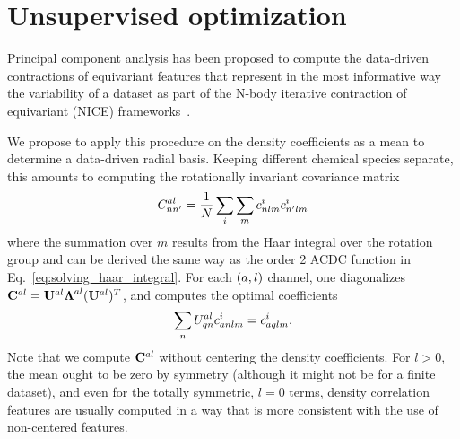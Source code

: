 \section{Unsupervised optimization}
Principal component analysis has been proposed to compute the data-driven contractions of equivariant features that represent in the most informative way the variability of a dataset as part of the N-body iterative contraction of equivariant (NICE) frameworks~\cite{niga+20jcp}.

We propose to apply this procedure on the density coefficients as a mean to determine a data-driven radial basis. 
Keeping different chemical species separate, this amounts to computing the rotationally invariant covariance matrix
\begin{equation}
  C^{a l}_{nn'}= \frac{1}{N} \sum_i \sum_m c^i_{nlm}c^i_{n^\prime lm}
\label{eq:cov}
\end{equation}
where the summation over $m$ results from the Haar integral over the rotation group and can be derived the same way as the order 2 ACDC function in Eq.~\ref{eq:solving_haar_integral}.
For each $(a, l)$ channel, one diagonalizes $\mathbf{C}^{al}=\mathbf{U}^{al} \boldsymbol{\Lambda}^{al} (\mathbf{U}^{al})^T$, and computes the optimal coefficients
\begin{equation}
  \sum_n U^{a l}_{qn} c^i_{a nlm} = c^i_{a qlm} \label{eq:contract}.
\end{equation}
Note that we compute $\mathbf{C}^{al}$ without centering the density coefficients. For $l>0$, the mean ought to be zero by symmetry (although it might not be for a finite dataset), and even for the totally symmetric, $l=0$ terms, density correlation features are usually computed in a way that is more consistent with the use of non-centered features. 

